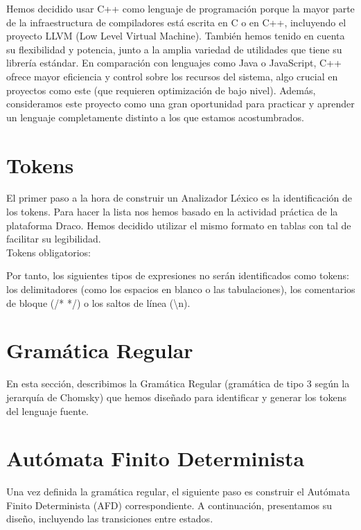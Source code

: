 \documentclass{article}
\begin{document}
Hemos decidido usar C++ como lenguaje de programación porque la mayor parte de la infraestructura de compiladores está escrita en C o en C++, incluyendo el proyecto LLVM (Low Level Virtual Machine). También hemos tenido en cuenta su flexibilidad y potencia, junto a la amplia variedad de utilidades que tiene su librería estándar. En comparación con lenguajes como Java o JavaScript, C++ ofrece mayor eficiencia y control sobre los recursos del sistema, algo crucial en proyectos como este (que requieren optimización de bajo nivel). Además, consideramos este proyecto como una gran oportunidad para practicar y aprender un lenguaje completamente distinto a los que estamos acostumbrados.

\newpage

\section{Tokens}
El primer paso a la hora de construir un Analizador Léxico es la identificación de los tokens. Para hacer la lista nos hemos basado en la actividad práctica de la plataforma Draco. Hemos decidido utilizar el mismo formato en tablas con tal de facilitar su legibilidad.\\
Tokens obligatorios:



Por tanto, los siguientes tipos de expresiones no serán identificados como tokens: los delimitadores (como los espacios en blanco o las tabulaciones), los comentarios de bloque (/* */) o los saltos de línea (\textbackslash n).

\section{Gramática Regular}

En esta sección, describimos la Gramática Regular (gramática de tipo 3 según la jerarquía de Chomsky) que hemos diseñado para identificar y generar los tokens del lenguaje fuente. 

\vspace{0.1cm}


\section{Autómata Finito Determinista}
Una vez definida la gramática regular, el siguiente paso es construir el Autómata Finito Determinista (AFD) correspondiente. A continuación, presentamos su diseño, incluyendo las transiciones entre estados.
\end{document}
